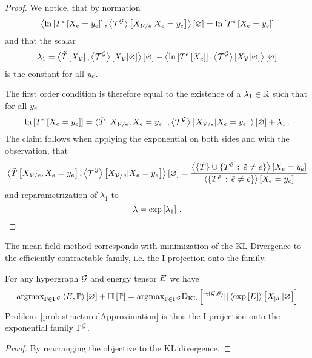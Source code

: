 \begin{proof}
	We notice, that by normation
		\[ \left\langle \ln \left[ T^{e}\left[X_{e}=y_{e}\right] \right], \left\langle \mathcal{T}^{\mathcal{G}}\right\rangle \left[ X_{\mathcal{V}/e} | X_{e}=y_{e} \right]\right\rangle \left[ \varnothing \right] =  \ln \left[ T^{e}\left[X_{e}=y_{e}\right] \right] \]
	and that the scalar
		\[ \lambda_1 = \left\langle \tilde{T}\left[X_{\mathcal{V}}\right],\left\langle \mathcal{T}^{\mathcal{G}}\right\rangle \left[ X_{\mathcal{V}} | \varnothing \right]\right\rangle \left[ \varnothing \right]	
		- \left\langle \ln \left[ T^{e}\left[X_{e}\right] \right],\left\langle \mathcal{T}^{\mathcal{G}}\right\rangle \left[ X_{\mathcal{V}} | \varnothing \right]\right\rangle \left[ \varnothing \right]	\]
	is the constant for all $y_{e}$.
	
	The first order condition is therefore equal to the existence of a $\lambda_1\in\mathbb{R}$ such that for all $y_{e}$ 
	\begin{align*}
		\ln \left[ T^{e}\left[X_{e}=y_{e}\right] \right]
		= 	\left\langle \tilde{T}\left[X_{\mathcal{V}/e},X_{e}=y_{e}\right], 
		\left\langle \mathcal{T}^{\mathcal{G}}\right\rangle \left[ X_{\mathcal{V}/e} | X_{e}=y_{e} \right]\right\rangle \left[ \varnothing \right] + \lambda_1 \, . 
	\end{align*}
	The claim follows when applying the exponential on both sides and with the observation, that 
	\begin{align*}
	\left\langle \tilde{T}\left[X_{\mathcal{V}/e},X_{e}=y_{e}\right], 
		\left\langle \mathcal{T}^{\mathcal{G}}\right\rangle \left[ X_{\mathcal{V}/e} | X_{e}=y_{e} \right]\right\rangle \left[ \varnothing \right]
		= 
		\frac{\left\langle \{\tilde{T}\}\cup\{T^{\tilde{e}} \, : \, \tilde{e}\neq e\}\right\rangle \left[ X_{e}=y_{e} \right] }{
		\left\langle \{T^{\tilde{e}} \, : \, \tilde{e}\neq e\}\right\rangle \left[ X_{e}=y_{e} \right] 
		}
	\end{align*}
	and reparametrization of $\lambda_1$ to
		\[ \lambda = \mathrm{exp}\left[\lambda_1\right] \, . \]
\end{proof}

The mean field method corresponds with minimization of the KL Divergence to the efficiently contractable family, i.e. the I-projection onto the family.

\begin{theorem}
	For any hypergraph $\mathcal{G}$ and energy tensor $E$ we have 
	\begin{align*}
		\mathrm{argmax}_{\mathbb{P}\in \Gamma^{\mathcal{G}}} \left\langle E, \mathbb{P}\right\rangle \left[ \varnothing \right]+ \mathbb{H}\left[\mathbb{P}\right]
		= \mathrm{argmax}_{\mathbb{P}\in \Gamma^{\mathcal{G}}} \mathrm{D}_{\mathrm{KL}}\left[ \mathbb{P}^{(\mathcal{G},\theta)} || \left\langle \mathrm{exp}\left[E\right]\right\rangle \left[ X_{[d]} | \varnothing \right] \right]
	\end{align*}
	Problem~\ref{prob:structuredApproximation} is thus the I-projection onto the exponential family $\Gamma^{\mathcal{G}}$.
\end{theorem}
\begin{proof}
	By rearranging the objective to the KL divergence.
\end{proof}


